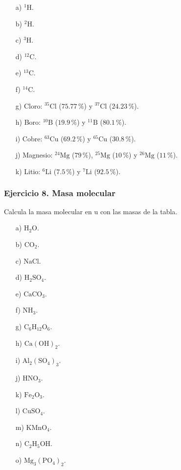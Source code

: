 \begin{enumerate}
    \item[a)] ${}^{1}\mathrm{H}$.
    \item[b)] ${}^{2}\mathrm{H}$.
    \item[c)] ${}^{3}\mathrm{H}$.
    \item[d)] ${}^{12}\mathrm{C}$.
    \item[e)] ${}^{13}\mathrm{C}$.
    \item[f)] ${}^{14}\mathrm{C}$.
    \item[g)] Cloro:
    ${}^{35}\mathrm{Cl}$ ($75.77\,\%$) y
    ${}^{37}\mathrm{Cl}$ ($24.23\,\%$).
    \item[h)] Boro:
    ${}^{10}\mathrm{B}$ ($19.9\,\%$) y
    ${}^{11}\mathrm{B}$ ($80.1\,\%$).
    \item[i)] Cobre:
    ${}^{63}\mathrm{Cu}$ ($69.2\,\%$) y
    ${}^{65}\mathrm{Cu}$ ($30.8\,\%$).
    \item[j)] Magnesio:
    ${}^{24}\mathrm{Mg}$ ($79\,\%$),
    ${}^{25}\mathrm{Mg}$ ($10\,\%$) y
    ${}^{26}\mathrm{Mg}$ ($11\,\%$).
    \item[k)] Litio:
    ${}^{6}\mathrm{Li}$ ($7.5\,\%$) y
    ${}^{7}\mathrm{Li}$ ($92.5\,\%$).
\end{enumerate}

\subsubsection*{Ejercicio 8. Masa molecular}

Calcula la masa molecular en $\mathrm{u}$ con las masas de la tabla.

\begin{enumerate}
    \item[a)] $\mathrm{H_2O}$.
    \item[b)] $\mathrm{CO_2}$.
    \item[c)] $\mathrm{NaCl}$.
    \item[d)] $\mathrm{H_2SO_4}$.
    \item[e)] $\mathrm{CaCO_3}$.
    \item[f)] $\mathrm{NH_3}$.
    \item[g)] $\mathrm{C_6H_{12}O_6}$.
    \item[h)] $\mathrm{Ca(OH)_2}$.
    \item[i)] $\mathrm{Al_2(SO_4)_3}$.
    \item[j)] $\mathrm{HNO_3}$.
    \item[k)] $\mathrm{Fe_2O_3}$.
    \item[l)] $\mathrm{CuSO_4}$.
    \item[m)] $\mathrm{KMnO_4}$.
    \item[n)] $\mathrm{C_2H_5OH}$.
    \item[o)] $\mathrm{Mg_3(PO_4)_2}$.
\end{enumerate}

